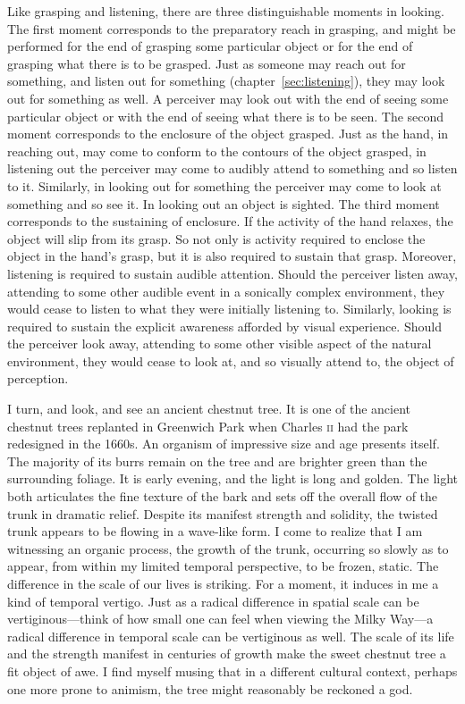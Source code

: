 Like grasping and listening, there are three distinguishable moments in looking. The first moment corresponds to the preparatory reach in grasping, and might be performed for the end of grasping some particular object or for the end of grasping what there is to be grasped. Just as someone may reach out for something, and listen out for something (chapter~\ref{sec:listening}), they may look out for something as well. A perceiver may look out with the end of seeing some particular object or with the end of seeing what there is to be seen. The second moment corresponds to the enclosure of the object grasped. Just as the hand, in reaching out, may come to conform to the contours of the object grasped, in listening out the perceiver may come to audibly attend to something and so listen to it. Similarly, in looking out for something the perceiver may come to look at something and so see it. In looking out an object is sighted. The third moment corresponds to the sustaining of enclosure. If the activity of the hand relaxes, the object will slip from its grasp. So not only is activity required to enclose the object in the hand’s grasp, but it is also required to sustain that grasp. Moreover, listening is required to sustain audible attention. Should the perceiver listen away, attending to some other audible event in a sonically complex environment, they would cease to listen to what they were initially listening to. Similarly, looking is required to sustain the explicit awareness afforded by visual experience. Should the perceiver look away, attending to some other visible aspect of the natural environment, they would cease to look at, and so visually attend to, the object of perception.

I turn, and look, and see an ancient chestnut tree. It is one of the ancient chestnut trees replanted in Greenwich Park when Charles \textsc{ii} had the park redesigned in the 1660s. An organism of impressive size and age presents itself. The majority of its burrs remain on the tree and are brighter green than the surrounding foliage. It is early evening, and the light is long and golden. The light both articulates the fine texture of the bark and sets off the overall flow of the trunk in dramatic relief. Despite its manifest strength and solidity, the twisted trunk appears to be flowing in a wave-like form. I come to realize that I am witnessing an organic process, the growth of the trunk, occurring so slowly as to appear, from within my limited temporal perspective, to be frozen, static. The difference in the scale of our lives is striking. For a moment, it induces in me a kind of temporal vertigo.  Just as a radical difference in spatial scale can be vertiginous---think of how small one can feel when viewing the Milky Way---a radical difference in temporal scale can be vertiginous as well. The scale of its life and the strength manifest in centuries of growth make the sweet chestnut tree a fit object of awe. I find myself musing that in a different cultural context, perhaps one more prone to animism, the tree might reasonably be reckoned a god. 

